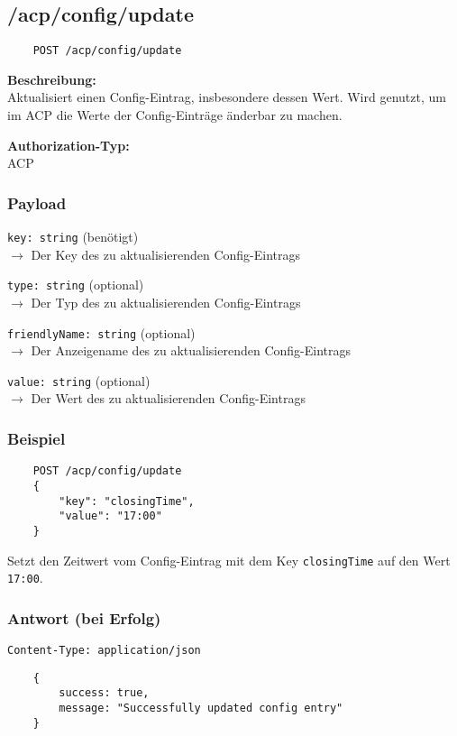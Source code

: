 \subsection{/acp/config/update}

\begin{lstlisting}
    POST /acp/config/update
\end{lstlisting}

\textbf{Beschreibung:} \\
Aktualisiert einen Config-Eintrag, insbesondere dessen Wert. Wird genutzt, um im ACP die Werte der Config-Einträge änderbar zu machen.

\textbf{Authorization-Typ:} \\
ACP

\subsubsection{Payload}

\lstinline{key: string} (benötigt) \\
$\rightarrow$ Der Key des zu aktualisierenden Config-Eintrags

\lstinline{type: string} (optional) \\
$\rightarrow$ Der Typ des zu aktualisierenden Config-Eintrags

\lstinline{friendlyName: string} (optional) \\
$\rightarrow$ Der Anzeigename des zu aktualisierenden Config-Eintrags

\lstinline{value: string} (optional) \\
$\rightarrow$ Der Wert des zu aktualisierenden Config-Eintrags


\subsubsection{Beispiel}

\begin{lstlisting}
    POST /acp/config/update
    {
        "key": "closingTime",
        "value": "17:00"
    }
\end{lstlisting}

Setzt den Zeitwert vom Config-Eintrag mit dem Key \lstinline{closingTime} auf den Wert \lstinline{17:00}.

\subsubsection{Antwort (bei Erfolg)}

\lstinline{Content-Type: application/json}
\begin{lstlisting}
    {
        success: true, 
        message: "Successfully updated config entry"
    }
\end{lstlisting}